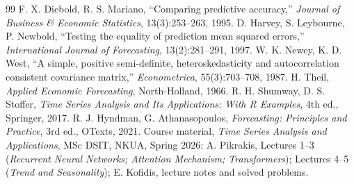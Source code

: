 \documentclass[11pt,a4paper]{article}
\begin{document}
\begin{thebibliography}{99}
 F. X. Diebold, R. S. Mariano, ``Comparing predictive accuracy,'' \emph{Journal of Business \& Economic Statistics}, 13(3):253--263, 1995.
 D. Harvey, S. Leybourne, P. Newbold, ``Testing the equality of prediction mean squared errors,'' \emph{International Journal of Forecasting}, 13(2):281--291, 1997.
 W. K. Newey, K. D. West, ``A simple, positive semi-definite, heteroskedasticity and autocorrelation consistent covariance matrix,'' \emph{Econometrica}, 55(3):703--708, 1987.
 H. Theil, \emph{Applied Economic Forecasting}, North-Holland, 1966.
 R. H. Shumway, D. S. Stoffer, \emph{Time Series Analysis and Its Applications: With R Examples}, 4th ed., Springer, 2017.
 R. J. Hyndman, G. Athanasopoulos, \emph{Forecasting: Principles and Practice}, 3rd ed., OTexts, 2021.
 Course material, \emph{Time Series Analysis and Applications}, MSc DSIT, NKUA, Spring 2026: A. Pikrakis, Lectures 1--3 (\emph{Recurrent Neural Networks; Attention Mechanism; Transformers}); Lectures 4--5 (\emph{Trend and Seasonality}); E. Kofidis, lecture notes and solved problems.
\end{thebibliography}

\appendix

\end{document}
